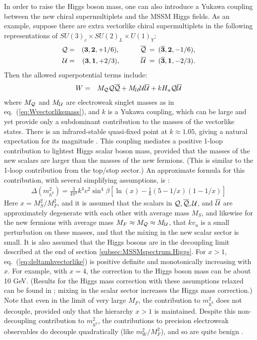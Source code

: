 \documentclass[11pt]{article}
\def\beq{\begin{eqnarray}}
\def\eeq{\end{eqnarray}}
\begin{document}
In order to raise the Higgs boson mass, one can also introduce a Yukawa 
coupling between the new chiral supermultiplets 
and the MSSM Higgs fields. As an example, suppose 
there are extra vectorlike chiral supermultiplets in the following 
representations of $SU(3)_c \times SU(2)_L \times U(1)_Y$:
\beq
{\cal Q} &=& ({\bf 3}, {\bf 2}, +1/6),\qquad\quad
\overline{\cal Q} \>=\> ({\bf \overline{3}}, {\bf 2}, -1/6),
\\
{\cal U} &=& ({\bf 3}, {\bf 1}, +2/3),\qquad\quad
\overline{\cal U} \>=\> ({\bf \overline{3}}, {\bf 1}, -2/3).
\eeq
Then the allowed superpotential terms include:
\beq
W &=& M_{\cal Q} {\cal Q}\overline{\cal Q} + 
M_{\cal U} {\cal U}\overline{\cal U}
+ k H_u {\cal Q}\overline{\cal U}
\eeq
where $M_{\cal Q}$ and $M_{\cal U}$ are electroweak singlet masses 
as in eq.~(\ref{eq:Wvectorlikemass}), and $k$ is a Yukawa 
coupling, which can be large and yet provide only a subdominant contribution to the
masses of the vectorlike states. There is an infrared-stable 
quasi-fixed point at $k\approx 1.05$, giving a natural expectation for its magnitude
\cite{Martin:2009bg}. 
This coupling mediates a positive 1-loop contribution to 
lightest Higgs scalar boson mass, provided that 
the masses of the new scalars are larger than the masses of the new fermions.
(This is similar to the 1-loop contribution from the top/stop sector.)   
An approximate formula for this contribution, 
with several simplifying assumptions, is \cite{Babu:2008ge}:
\beq
\Delta (m_{h^0}^2) = \frac{3}{4 \pi^2} k^4 v^2 \sin^4\beta \left [
\ln(x) - \frac{1}{6} (5-1/x)(1-1/x) \right ]
\label{eq:deltamhvectorlike}
\eeq
Here $x = M_S^2/M_F^2$, and it is assumed 
that the scalars in ${\cal Q}, \overline{\cal Q},
{\cal U}$, and $\overline{\cal U}$ are approximately degenerate with 
each other with average mass $M_S$, and likewise for the new fermions with 
average mass $M_F \approx M_{\cal Q} \approx M_{\cal U} $, that 
$k v_u$ is a small perturbation on these masses,
and that the mixing in the new scalar sector is small. 
It is also assumed that the Higgs bosons are in 
the decoupling limit described at the end of section
\ref{subsec:MSSMspectrum.Higgs}. For $x>1$, 
eq.~(\ref{eq:deltamhvectorlike}) is positive definite 
and monotonically increasing with $x$. For example, with $x=4$, the correction 
to the Higgs boson mass can be about 10 GeV. (Results for the Higgs mass 
correction with these assumptions relaxed can be found in \cite{Martin:2009bg}; mixing in the scalar sector increases the Higgs mass correction.)
Note that even in the limit of very large $M_F$, the contribution to $m_{h^0}^2$
does not decouple, provided only that the hierarchy $x>1$ is maintained. Despite 
this non-decoupling contribution to $m_{h^0}^2$, the contributions to 
precision electroweak observables do decouple quadratically (like $m_W^2/M_F^2$), and so are quite benign \cite{Martin:2009bg}.
\end{document}
